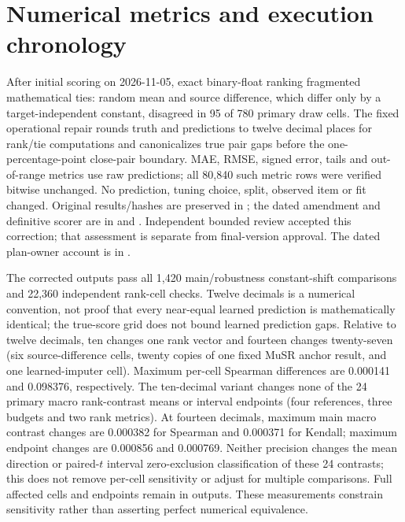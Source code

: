 \documentclass{article}
\begin{document}
\section{Numerical metrics and execution chronology}\label{app:numerics}
After initial scoring on 2026-11-05, exact binary-float ranking fragmented mathematical ties: random mean and source difference, which differ only by a target-independent constant, disagreed in 95 of 780 primary draw cells. The fixed operational repair rounds truth and predictions to twelve decimal places for rank/tie computations and canonicalizes true pair gaps before the one-percentage-point close-pair boundary. MAE, RMSE, signed error, tails and out-of-range metrics use raw predictions; all 80,840 such metric rows were verified bitwise unchanged. No prediction, tuning choice, split, observed item or fit changed. Original results/hashes are preserved in ; the dated amendment and definitive scorer are in  and . Independent bounded review accepted this correction; that assessment is separate from final-version approval. The dated plan-owner account is in .

The corrected outputs pass all 1,420 main/robustness constant-shift comparisons and 22,360 independent rank-cell checks. Twelve decimals is a numerical convention, not proof that every near-equal learned prediction is mathematically identical; the true-score grid does not bound learned prediction gaps. Relative to twelve decimals, ten changes one rank vector and fourteen changes twenty-seven (six source-difference cells, twenty copies of one fixed MuSR anchor result, and one learned-imputer cell). Maximum per-cell Spearman differences are 0.000141 and 0.098376, respectively. The ten-decimal variant changes none of the 24 primary macro rank-contrast means or interval endpoints (four references, three budgets and two rank metrics). At fourteen decimals, maximum main macro contrast changes are 0.000382 for Spearman and 0.000371 for Kendall; maximum endpoint changes are 0.000856 and 0.000769. Neither precision changes the mean direction or paired-$t$ interval zero-exclusion classification of these 24 contrasts; this does not remove per-cell sensitivity or adjust for multiple comparisons. Full affected cells and endpoints remain in  outputs. These measurements constrain sensitivity rather than asserting perfect numerical equivalence.
\end{document}
